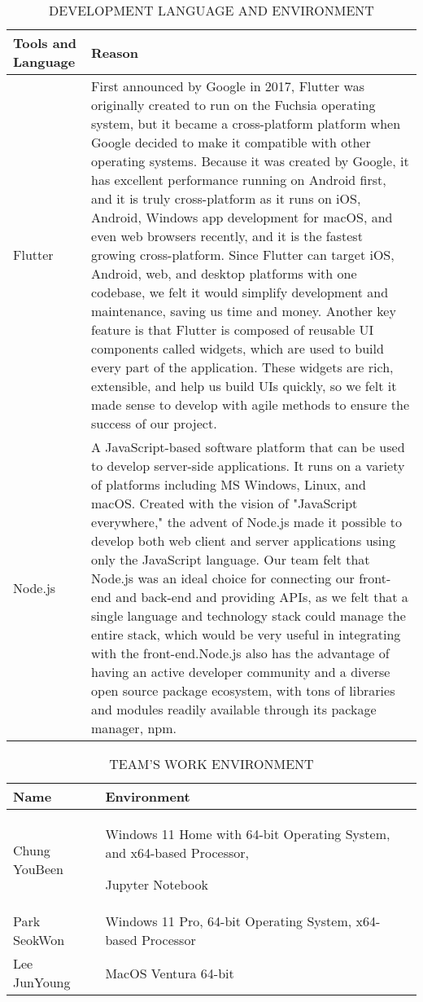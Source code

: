 \documentclass[conference]{IEEEtran}
\begin{document}
\begin{table}[ht]
\caption{DEVELOPMENT LANGUAGE AND ENVIRONMENT}
\begin{tabular}{| p{2.9cm}|p{4.5cm} |}

\hline
Tools and Language & Reason  \\
\hline
Flutter
& First announced by Google in 2017, Flutter was originally created to run on the Fuchsia operating system, but it became a cross-platform platform when Google decided to make it compatible with other operating systems.
Because it was created by Google, it has excellent performance running on Android first, and it is truly cross-platform as it runs on iOS, Android, Windows app development for macOS, and even web browsers recently, and it is the fastest growing cross-platform.
Since Flutter can target iOS, Android, web, and desktop platforms with one codebase, we felt it would simplify development and maintenance, saving us time and money. Another key feature is that Flutter is composed of reusable UI components called widgets, which are used to build every part of the application. These widgets are rich, extensible, and help us build UIs quickly, so we felt it made sense to develop with agile methods to ensure the success of our project.\\

\hline
Node.js 
& A JavaScript-based software platform that can be used to develop server-side applications.
It runs on a variety of platforms including MS Windows, Linux, and macOS. Created with the vision of "JavaScript everywhere," the advent of Node.js made it possible to develop both web client and server applications using only the JavaScript language.
Our team felt that Node.js was an ideal choice for connecting our front-end and back-end and providing APIs, as we felt that a single language and technology stack could manage the entire stack, which would be very useful in integrating with the front-end.Node.js also has the advantage of having an active developer community and a diverse open source package ecosystem, with tons of libraries and modules readily available through its package manager, npm.
 \\
\hline
\end{tabular}
\end{table}

\begin{table}[ht]
\caption{TEAM’S WORK ENVIRONMENT}
\begin{tabular}{| p{2.9cm}|p{4.5cm} |}

\hline
Name & Environment \\
\hline
Chung YouBeen 
& Windows 11 Home with 64-bit Operating
System, and x64-based Processor, \par Jupyter Notebook \\

\hline

Park SeokWon 
& Windows 11 Pro, 64-bit Operating System, x64-based Processor \\

\hline
Lee JunYoung
& MacOS Ventura 64-bit
 \\
\hline
\end{tabular}
\end{table}
\end{document}
